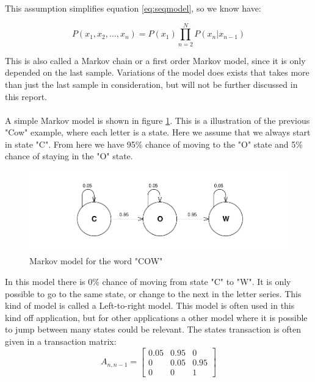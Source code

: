 This assumption simplifies equation \ref{eq:seqmodel}, so we know have:

\begin{equation}
 P(x_1, x_2, ..., x_n) = P(x_1) \prod\limits_{n=2}^N{P(x_n| x_{n-1})}
\end{equation}

This is also called a Markov chain or a first order Markov model, since it is only depended on the last sample. Variations of the model does exists that takes more than just the last sample in consideration, but will not be further discussed in this report.  
\\\ \\
A simple Markov model is shown in figure \ref{fig:simpleMarkov}. This is a illustration of the previous "Cow" example, where each letter is a state. Here we assume that we always start in state "C". From here we have 95\% chance of moving to the "O" state and 5\% chance of staying in the "O" state. 

\begin{figure}[H]
\centering
\includegraphics[scale=0.8]{billeder/simpleMarkov}
\caption{Markov model for the word "COW"}
\label{fig:simpleMarkov}
\end{figure}
		
In this model there is 0\% chance of moving from state "C" to "W". It is only possible to go to the same state, or change to the next in the letter series. This kind of model is called a Left-to-right model. This model is often used in this kind off application, but for other applications a other model where it is possible to jump between many states could be relevant. The states transaction is often given in a transaction matrix: 
\begin{equation}
	A_{n,n-1} = 
	\begin{bmatrix}
  	0.05 & 0.95 & 0 \\
  	0 & 0.05 & 0.95	\\
  	0 & 0 & 	1
 	\end{bmatrix}
 	\label{eq:Amat}
\end{equation}


